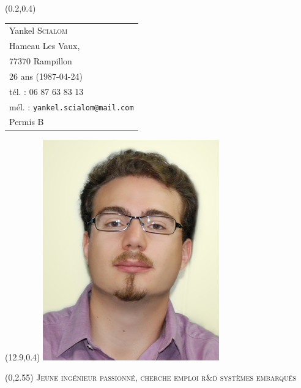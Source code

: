 \documentclass[10pt]{article}
\newcommand{\emphcolor}{\color{NavyBlue}}
\newcommand{\cemph}[1]{{\emphcolor #1}}
\begin{document}
\thispagestyle{empty}

\begin{textblock}{7}(0.2,0.4)
	\begin{tabular}{l}
		\small
		Yankel \textsc{Scialom}\\
		Hameau Les Vaux,\\ 77370 Rampillon\\
		26 ans (1987-04-24)\\
		tél. : 06 87 63 83 13\\
		mél. : \texttt{yankel.scialom@mail.com}\\
		Permis B
	\end{tabular}
\end{textblock}

\begin{textblock}{7}(12.9,0.4)
	\includegraphics{photo-min}
\end{textblock}


\begin{textblock}{16}(0,2.55)
	\centering
	\fontsize{15pt}{18pt}\selectfont
	\cemph{\textsc{Jeune ingénieur passionné, cherche emploi r\&d systèmes embarqués}}
\end{textblock}

\end{document}
